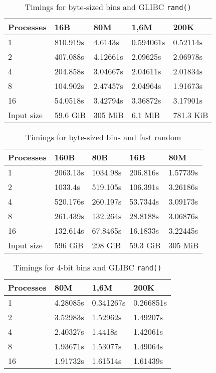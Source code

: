 \documentclass[10pt,a4paper]{article}
\begin{document}
\begin{table}
\begin{tabular}{|l|l l l l|}
\hline 
Processes & 16B & 80M & 1,6M & 200K \\ 
\hline 
1     & 810.919s      & 4.6143s       & 0.594061s     & 0.52114s\\
2     & 407.088s      & 4.12661s      & 2.09625s      & 2.06978s\\
4     & 204.858s      & 3.04667s      & 2.04611s      & 2.01834s\\
8     & 104.902s      & 2.47457s      & 2.04964s      & 1.91673s\\
16    & 54.0518s      & 3.42794s      & 3.36872s      & 3.17901s\\
\hline 
Input size & 59.6 GiB & 305 MiB & 6.1 MiB & 781.3 KiB \\
\hline
\end{tabular}
\caption{Timings for byte-sized bins and GLIBC \texttt{rand()}}
\label{table:byte1}
\end{table} 

\begin{table}
\begin{tabular}{|l|l l l l|}
\hline 
Processes & 160B & 80B & 16B & 80M \\ 
\hline 
1     & 2063.13s      & 1034.98s      & 206.816s      & 1.57739s\\
2     & 1033.4s       & 519.105s      & 106.391s      & 3.26186s\\
4     & 520.176s      & 260.197s      & 53.7344s      & 3.09173s\\
8     & 261.439s      & 132.264s      & 28.8188s      & 3.06876s\\
16    & 132.614s      & 67.8465s      & 16.1833s      & 3.22445s\\
\hline 
Input size & 596 GiB & 298 GiB & 59.3 GiB & 305 MiB \\
\hline
\end{tabular}
\caption{Timings for byte-sized bins and fast random}
\label{table:byte2}
\end{table} 

\begin{table}
\begin{tabular}{|l|l l l|}
\hline 
Processes & 80M & 1,6M & 200K \\ 
\hline 
1       &            4.28085s  &     0.341267s   &   0.266851s\\
2       &            3.52983s  &     1.52962s    &   1.49207s\\
4       &            2.40327s  &     1.4418s     &   1.42061s\\
8       &            1.93671s  &     1.53077s    &   1.49064s\\
16      &            1.91732s  &     1.61514s    &   1.61439s\\
\hline 
\end{tabular}
\caption{Timings for 4-bit bins and GLIBC \texttt{rand()}}
\label{table:nibble}
\end{table} 
\end{document}
